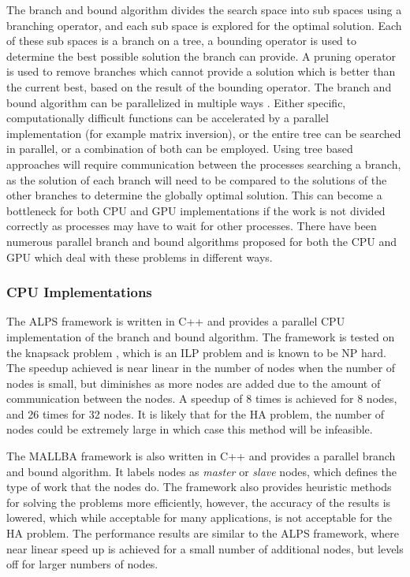 \documentclass[10pt,a4paer,twocolumn]{article}
\begin{document}
The branch and bound algorithm divides the search space into sub spaces using a branching operator, and each sub
space is explored for the optimal solution. Each of these sub spaces is a branch on a tree, a bounding 
operator is used to determine the best possible solution the branch can provide. A pruning operator is used 
to remove branches which cannot provide a solution which is better than the current best, based on the result
of the bounding operator.
The branch and bound algorithm can be parallelized in multiple ways \cite{crainic:2006}. Either specific,
computationally difficult functions can be accelerated by a parallel implementation (for example matrix
inversion), or the entire tree can be searched in parallel, or a combination of both can be employed. Using tree
based approaches will require communication between the processes searching a branch, as the solution of each
branch will need to be compared to the solutions of the other branches to determine the globally optimal
solution. This can become a bottleneck for both CPU and GPU implementations if the work is not divided
correctly as processes may have to wait for other processes. There have been numerous parallel branch and 
bound algorithms proposed for both the CPU and GPU which deal with these problems in different ways.

\subsubsection{CPU Implementations } \label{ssec:cpuimp}

The ALPS framework \cite{xu:2005} is written in C++ and provides a parallel CPU implementation of the branch
and bound algorithm. The framework is tested on the knapsack problem \cite{kedia:2005}, which is an ILP problem 
and is known to be NP hard. The speedup achieved is near linear in the number of nodes when the number of 
nodes is small, but diminishes as more nodes are added due to the amount of communication between the nodes. 
A speedup of 8 times is achieved for 8 nodes, and 26 times for 32 nodes. It is likely that for the HA problem, 
the number of nodes could be extremely large in which case this method will be infeasible. 

The MALLBA framework \cite{alba:2002} is also written in C++ and provides a parallel branch and bound
algorithm. It labels nodes as \textit{master} or \textit{slave} nodes, which defines the type of work that the
nodes do. The framework also provides heuristic methods for solving the problems more efficiently, however, the
accuracy of the results is lowered, which while acceptable for many applications, is not acceptable for the HA
problem. The performance results are similar to the ALPS framework, where near linear speed up is achieved for
a small number of additional nodes, but levels off for larger numbers of nodes.
\end{document}
